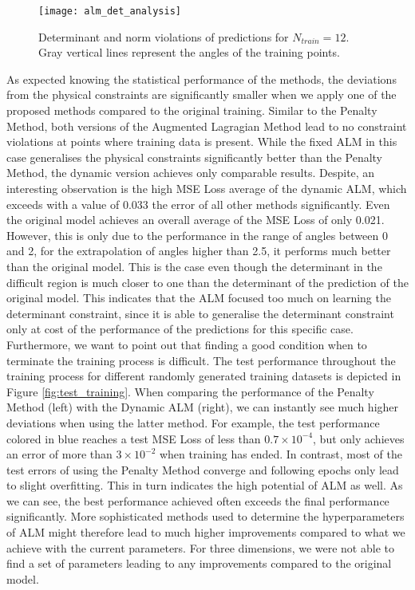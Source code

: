 \begin{figure}[H]
	\texttt{[image: alm\_det\_analysis]}
	\caption{Determinant and norm violations of predictions for $N_{train} = 12$. Gray vertical lines represent the angles of the training points.}
	\label{fig:alm_det_analysis}
\end{figure}

As expected knowing the statistical performance of the methods, the deviations from the physical constraints are significantly smaller when we apply one of the proposed methods compared to the original training. Similar to the Penalty Method, both versions of the Augmented Lagragian Method lead to no constraint violations at points where training data is present. While the fixed ALM in this case generalises the physical constraints significantly better than the Penalty Method, the dynamic version achieves only comparable results. Despite, an interesting observation is the high MSE Loss average of the dynamic ALM, which exceeds with a value of 0.033 the error of all other methods significantly. Even the original model achieves an overall average of the MSE Loss of only 0.021. However, this is only due to the performance in the range of angles between 0 and 2, for the extrapolation of angles higher than 2.5, it performs much better than the original model. This is the case even though the determinant in the difficult region is much closer to one than the determinant of the prediction of the original model. This indicates that the ALM focused too much on learning the determinant constraint, since it is able to generalise the determinant constraint only at cost of the performance of the predictions for this specific case.\\
\indent Furthermore, we want to point out that finding a good condition when to terminate the training process is difficult. The test performance throughout the training process for different randomly generated training datasets is depicted in Figure \ref{fig:test_training}. When comparing the performance of the Penalty Method (left) with the Dynamic ALM (right), we can instantly see much higher deviations when using the latter method. For example, the test performance colored in blue reaches a test MSE Loss of less than $0.7\times 10^{-4}$, but only achieves an error of more than $3\times 10^{-2}$ when training has ended. In contrast, most of the test errors of using the Penalty Method converge and following epochs only lead to slight overfitting. This in turn indicates the high potential of ALM as well. As we can see, the best performance achieved often exceeds the final performance significantly. More sophisticated methods used to determine the hyperparameters of ALM  might therefore lead to much higher improvements compared to what we achieve with the current parameters. For three dimensions, we were not able to find a set of parameters leading to any improvements compared to the original model.
